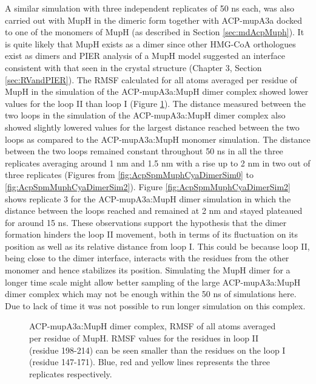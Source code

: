 \newpage					
	A similar simulation with three independent replicates of 50 ns each, was also carried out with MupH in the dimeric form together with ACP-mupA3a docked to one of the monomers of MupH (as described in Section \ref{sec:mdAcpMuph}). It is quite likely that MupH exists as a dimer since other HMG-CoA orthologues exist as dimers and PIER analysis of a MupH model suggested an interface consistent with that seen in the crystal structure (Chapter 3, Section \ref{sec:RVandPIER}). The RMSF calculated for all atoms averaged per residue of MupH in the simulation of the ACP-mupA3a:MupH dimer complex showed lower values for the loop II than loop I (Figure \ref{fig:acpMuphDimerRmsf}). The distance measured between the two loops in the simulation of the ACP-mupA3a:MupH dimer complex also showed slightly lowered values for the largest distance reached between the two loops as compared to the ACP-mupA3a:MupH monomer simulation. The distance between the two loops remained constant throughout 50 ns in all the three replicates averaging around 1 nm and 1.5 nm with a rise up to 2 nm in two out of three replicates (Figures from \ref{fig:AcpSpmMuphCyaDimerSim0} to \ref{fig:AcpSpmMuphCyaDimerSim2}). Figure \ref{fig:AcpSpmMuphCyaDimerSim2} shows replicate 3 for the ACP-mupA3a:MupH dimer simulation in which the distance between the loops reached and remained at 2 nm and stayed plateaued for around 15 ns. These observations support the hypothesis that the dimer formation hinders the loop II movement, both in terms of its fluctuation on its position as well as its relative distance from loop I. This could be because loop II, being close to the dimer interface, interacts with the residues from the other monomer and hence stabilizes its position. Simulating the MupH dimer for a longer time scale might allow better sampling of the large ACP-mupA3a:MupH dimer complex which may not be enough within the 50 ns of simulations here. Due to lack of time it was not possible to run longer simulation on this complex. 

		\setlength\fboxsep{5pt}
		\setlength\fboxrule{1.5pt}
		\begin{figure}[htbp]
		\centering
		\caption[ACP-mupA3a:MupH dimer complex, RMSF of all atoms averaged per residue of MupH.]{ACP-mupA3a:MupH dimer complex, RMSF of all atoms averaged per residue of MupH. RMSF values for the residues in loop II (residue 198-214) can be seen smaller than the residues on the loop I (residue 147-171). Blue, red and yellow lines represents the three replicates respectively.}
		\label{fig:acpMuphDimerRmsf}
		\end{figure}	

